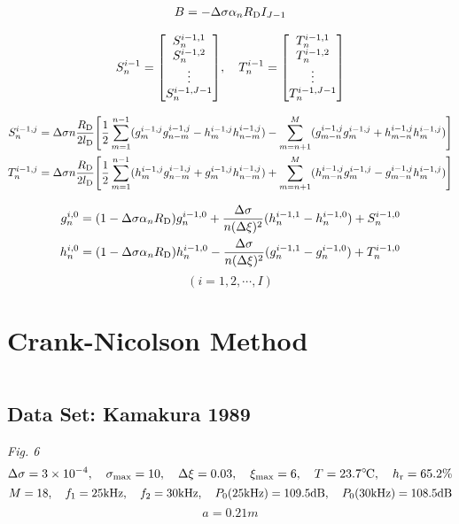 \documentclass{article}
\begin{document}
\begin{align}
	B = -\Delta \sigma \alpha_n R_\text{D} I_{J-1}
\end{align}

\begin{align}
	S_n^{i-1} = \mqty[S_n^{i-1,1} \\ S_n^{i-1,2} \\ \vdots \\ S_n^{i-1,J-1}]\qc
	T_n^{i-1} = \mqty[T_n^{i-1,1} \\ T_n^{i-1,2} \\ \vdots \\ T_n^{i-1,J-1}]
\end{align}

\begin{align}
	S_n^{i-1,j} = \Delta \sigma n\frac{R_\text{D}}{2l_\text{D}}\qty[\frac12\sum_{m=1}^{n-1}(g_m^{i-1,j}g_{n-m}^{i-1,j}-h_m^{i-1,j}h_{n-m}^{i-1,j}) - \sum_{m=n+1}^M (g_{m-n}^{i-1,j} g_m^{i-1,j}+h_{m-n}^{i-1,j}h_m^{i-1,j})]\\
	T_n^{i-1,j} = \Delta \sigma n\frac{R_\text{D}}{2l_\text{D}}\qty[\frac12\sum_{m=1}^{n-1}(h_m^{i-1,j}g_{n-m}^{i-1,j}+g_m^{i-1,j}h_{n-m}^{i-1,j}) + \sum_{m=n+1}^M (h_{m-n}^{i-1,j} g_m^{i-1,j}-g_{m-n}^{i-1,j}h_m^{i-1,j})]
\end{align}

\begin{align}
	g_n^{i,0} = (1-\Delta\sigma  \alpha_n R_\text{D})g_n^{i-1,0} + \frac{\Delta \sigma}{n(\Delta\xi)^2} (h_n^{i-1,1}-h_n^{i-1,0})+ S_n^{i-1,0}\\
	h_n^{i,0} = (1-\Delta\sigma  \alpha_n R_\text{D})h_n^{i-1,0} - \frac{\Delta \sigma}{n(\Delta\xi)^2} (g_n^{i-1,1}-g_n^{i-1,0}) + T_n^{i-1,0}
\end{align}
$$
	(i=1,2,\cdots,I) \nonumber
	$$

\section{Crank-Nicolson Method}
\begin{equation}
\end{equation}

\subsection{Data Set: Kamakura 1989}
\emph{Fig. 6}
$$
\Delta \sigma = 3\times 10^{-4}\qc \sigma\st{max} = 10\qc \Delta \xi = 0.03\qc \xi\st{max} = 6\qc T = 23.7 \celsius\qc h\st{r} = 65.2\%
$$
$$
M=18\qc f_1 = 25 \text{kHz}\qc f_2 = 30 \text{kHz}\qc P_0(25 \text{kHz}) = 109.5 \text{dB}\qc P_0(30 \text{kHz})=108.5 \text{dB}
$$
$$
a = 0.21\si{m}
$$
\end{document}
